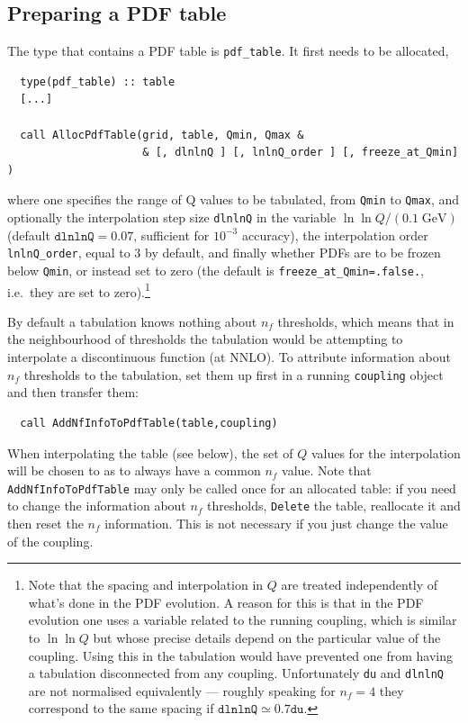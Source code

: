 \documentclass[12pt]{article}
\newcommand{\GeV}{\;\mathrm{GeV}}
\newcommand{\ie}{i.e.\ }
\newcommand{\ttt}[1]{\texttt{#1}}
\begin{document}
\subsection{Preparing a PDF table}
The type that contains a PDF table is \ttt{pdf\_table}. It first needs
to be allocated,
\begin{lstlisting}
  type(pdf_table) :: table
  [...]

  call AllocPdfTable(grid, table, Qmin, Qmax &
                     & [, dlnlnQ ] [, lnlnQ_order ] [, freeze_at_Qmin] )
\end{lstlisting}
where one specifies the range of Q values to be tabulated, from
\ttt{Qmin} to \ttt{Qmax}, and optionally the interpolation step size
\ttt{dlnlnQ} in the variable $\ln \ln Q/(0.1\GeV)$ (default
$\ttt{dlnlnQ}=0.07$, sufficient for $10^{-3}$ accuracy), the
interpolation order \ttt{lnlnQ\_order}, equal to $3$ by default, and
finally whether PDFs are to be frozen below \ttt{Qmin}, or instead set
to zero (the default is \ttt{freeze\_at\_Qmin=.false.}, \ie they are
set to zero).\footnote{Note that the spacing and interpolation in $Q$
  are treated independently of what's done in the PDF evolution. A
  reason for this is that in the PDF evolution one uses a variable
  related to the running coupling, which is similar to $\ln \ln Q$ but
  whose precise details depend on the particular value of the
  coupling.  Using this in the tabulation would have prevented one
  from having a tabulation disconnected from any coupling.
  Unfortunately \ttt{du} and \ttt{dlnlnQ} are not normalised
  equivalently --- roughly speaking for $n_f = 4$ they correspond to
  the same spacing if $\ttt{dlnlnQ} \simeq 0.7 \ttt{du}$.}

By default a tabulation knows nothing about $n_f$ thresholds, which
means that in the neighbourhood of thresholds the tabulation would be
attempting to interpolate a discontinuous function (at NNLO). To
attribute information about $n_f$ thresholds to the tabulation, set
them up first in a running \ttt{coupling} object and then transfer
them:
\begin{lstlisting}
  call AddNfInfoToPdfTable(table,coupling)
\end{lstlisting}
When interpolating the table (see below), the set of $Q$ values for
the interpolation will be chosen to as to always have a common $n_f$
value. Note that \ttt{AddNfInfoToPdfTable} may only be called once for
an allocated table: if you need to change the information about $n_f$
thresholds, \ttt{Delete} the table, reallocate it and then reset the
$n_f$ information. This is not necessary if you just
change the value of the coupling.
\end{document}
